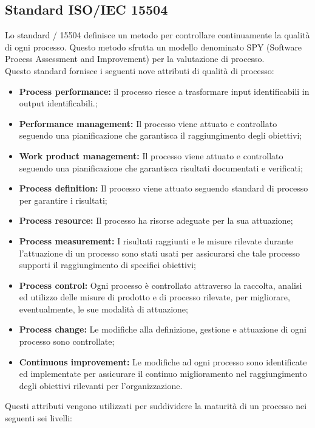 \documentclass{scalatekids-article}
\begin{document}
\subsection{Standard ISO/IEC 15504}
\label{sec:ISO/IEC15504}
Lo standard / 15504 definisce un metodo per controllare continuamente la qualità di ogni processo. Questo metodo sfrutta un modello denominato SPY (Software Process Assessment and Improvement) per la valutazione di processo.\\
Questo standard fornisce i seguenti nove attributi di qualità di processo:
\begin{itemize}
  \item{\textbf{Process performance:} il processo riesce a trasformare input identificabili in output identificabili.;}
  \item{\textbf{Performance management:} Il processo viene attuato e controllato seguendo una pianificazione che garantisca il raggiungimento degli obiettivi;}
  \item{\textbf{Work product management:} Il processo viene attuato e controllato seguendo una pianificazione che garantisca risultati documentati e verificati;}
  \item{\textbf{Process definition:} Il processo viene attuato seguendo standard di processo per garantire i risultati;}
  \item{\textbf{Process resource:} Il processo ha risorse adeguate per la sua attuazione;}
  \item{\textbf{Process measurement:} I risultati raggiunti e le misure rilevate durante l'attuazione di un processo sono stati usati per assicurarsi che tale processo supporti il raggiungimento di specifici obiettivi;}
  \item{\textbf{Process control:} Ogni processo è controllato attraverso la raccolta, analisi ed utilizzo delle misure di prodotto e di processo rilevate, per migliorare, eventualmente, le sue modalità di attuazione;}
  \item{\textbf{Process change:} Le modifiche alla definizione, gestione e attuazione di ogni processo sono controllate;}
  \item{\textbf{Continuous improvement:} Le modifiche ad ogni processo sono identificate ed implementate per assicurare il continuo miglioramento nel raggiungimento degli obiettivi rilevanti per l'organizzazione.}
\end{itemize}
Questi attributi vengono utilizzati per suddividere la maturità di un processo nei seguenti sei livelli:
\end{document}
